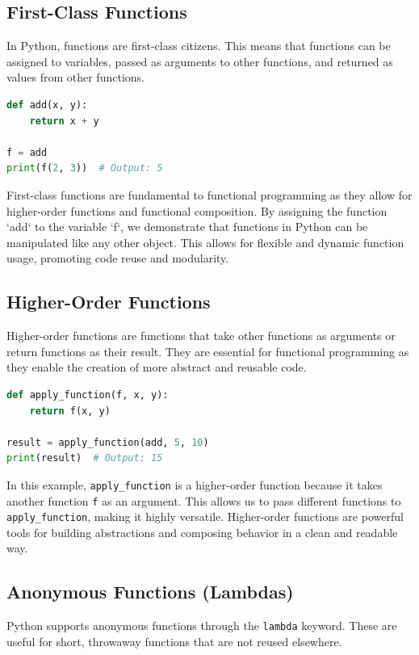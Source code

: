\documentclass[a4paper]{article}
\begin{document}
\subsection{First-Class Functions}
In Python, functions are first-class citizens. This means that functions can be assigned to variables, passed as arguments to other functions, and returned as values from other functions.\\

\begin{lstlisting}[language=Python, caption=First-Class Functions]
def add(x, y):
    return x + y

f = add
print(f(2, 3))  # Output: 5
\end{lstlisting}

First-class functions are fundamental to functional programming as they allow for higher-order functions and functional composition. By assigning the function `add` to the variable `f`, we demonstrate that functions in Python can be manipulated like any other object. This allows for flexible and dynamic function usage, promoting code reuse and modularity.\\

\subsection{Higher-Order Functions}
Higher-order functions are functions that take other functions as arguments or return functions as their result. They are essential for functional programming as they enable the creation of more abstract and reusable code.\\

\begin{lstlisting}[language=Python, caption=Higher-Order Functions]
def apply_function(f, x, y):
    return f(x, y)

result = apply_function(add, 5, 10)
print(result)  # Output: 15
\end{lstlisting}

In this example, \texttt{apply\_function} is a higher-order function because it takes another function \texttt{f} as an argument. This allows us to pass different functions to \texttt{apply\_function}, making it highly versatile. Higher-order functions are powerful tools for building abstractions and composing behavior in a clean and readable way.\\

\subsection{Anonymous Functions (Lambdas)}
Python supports anonymous functions through the \texttt{lambda} keyword. These are useful for short, throwaway functions that are not reused elsewhere.\\
\end{document}
